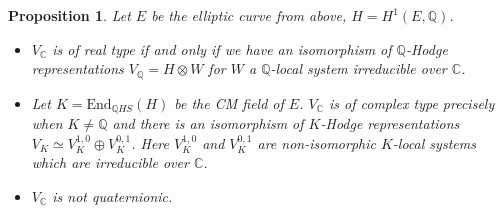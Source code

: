 \documentclass[10pt,a4paper]{amsart}
\newtheorem{proposition}{Proposition}
\newcommand{\C}{\mathbb{C}}
\newcommand{\Q}{\mathbb{Q}}
\begin{document}
\begin{proposition} \label{isotrivial-rep-classification}
    Let \(E\) be the elliptic curve from above, \(H = H^1(E, \Q)\).
    \begin{itemize}
    \item[(a)] \(V_\C\) is of real type if and only if we have an isomorphism
    of \(\Q\)-Hodge representations \(V_\Q = H \otimes W\) for \(W\) a
    \(\Q\)-local system irreducible over \(\C\).
    \item[(b)] Let \(K = \mathrm{End}_{\Q HS}(H)\) be the CM field of \(E\).
    \(V_\C\) is of complex type precisely when \(K \neq \Q\) and there is an 
    isomorphism of \(K\)-Hodge representations  \(V_K \simeq V_K^{1,0} \oplus V_K^{0,1}\).
    Here \(V_K^{1,0}\) and \(V_K^{0,1}\) are non-isomorphic \(K\)-local systems which
    are irreducible over \(\C\).
    \item[(c)] \(V_\C\) is not quaternionic.
    \end{itemize}
\end{proposition}
\end{document}
